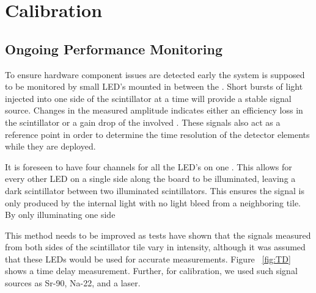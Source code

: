 \documentclass[../BTOF_summary.tex]{subfiles}
\begin{document}
\section{Calibration}

\subsection{Ongoing Performance Monitoring}

To ensure hardware component issues are detected early the system is supposed to be monitored by small LED's mounted in between the \sipms .
Short bursts of light injected into one side of the scintillator at a time will provide a stable signal source.
Changes in the measured amplitude indicates either an efficiency loss in the scintillator or a gain drop of the involved \sipms .
These signals also act as a reference point in order to determine the time resolution of the detector elements while they are deployed.

It is foreseen to have four channels for all the LED's on one \railboard .
This allows for every other LED on a single side along the board to be illuminated, leaving a dark scintillator between two illuminated scintillators.
This ensures the signal is only produced by the internal light with no light bleed from a neighboring tile.
By only illuminating one side 

This method needs to be improved as tests have shown that the signals measured from both sides of the scintillator tile vary in intensity, although it was assumed that these LEDs would be used for accurate measurements.
Figure ~\ref{fig:TD} shows a time delay measurement.
Further, for calibration, we used such signal sources as Sr-90, Na-22, and a laser.
\end{document}
